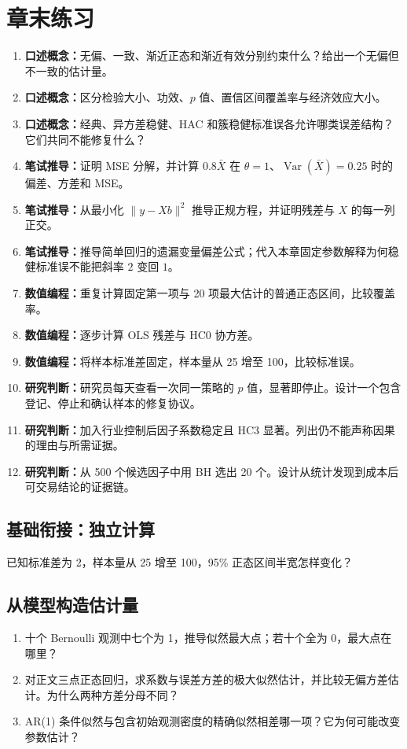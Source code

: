 \section*{章末练习}
\begingroup\small
\begin{enumerate}[leftmargin=*]
  \item \textbf{口述概念：}无偏、一致、渐近正态和渐近有效分别约束什么？给出一个无偏但不一致的估计量。
  \item \textbf{口述概念：}区分检验大小、功效、$p$ 值、置信区间覆盖率与经济效应大小。
  \item \textbf{口述概念：}经典、异方差稳健、HAC 和簇稳健标准误各允许哪类误差结构？它们共同不能修复什么？
  \item \textbf{笔试推导：}证明 MSE 分解，并计算 $0.8\bar X$ 在 $\theta=1$、$\operatorname{Var}(\bar X)=0.25$ 时的偏差、方差和 MSE。
  \item \textbf{笔试推导：}从最小化 $\lVert y-Xb\rVert^2$ 推导正规方程，并证明残差与 $X$ 的每一列正交。
  \item \textbf{笔试推导：}推导简单回归的遗漏变量偏差公式；代入本章固定参数解释为何稳健标准误不能把斜率 $2$ 变回 $1$。

  \item \textbf{数值编程：}重复计算固定第一项与 20 项最大估计的普通正态区间，比较覆盖率。

  \item \textbf{数值编程：}逐步计算 OLS 残差与 HC0 协方差。

  \item \textbf{数值编程：}将样本标准差固定，样本量从 25 增至 100，比较标准误。
  \item \textbf{研究判断：}研究员每天查看一次同一策略的 $p$ 值，显著即停止。设计一个包含登记、停止和确认样本的修复协议。
  \item \textbf{研究判断：}加入行业控制后因子系数稳定且 HC3 显著。列出仍不能声称因果的理由与所需证据。
  \item \textbf{研究判断：}从 500 个候选因子中用 BH 选出 20 个。设计从统计发现到成本后可交易结论的证据链。
\end{enumerate}
\endgroup

\subsection*{基础衔接：独立计算}
已知标准差为 2，样本量从 25 增至 100，95\% 正态区间半宽怎样变化？

\subsection*{从模型构造估计量}
\begin{enumerate}[leftmargin=*]
\item 十个 Bernoulli 观测中七个为 1，推导似然最大点；若十个全为 0，最大点在哪里？
\item 对正文三点正态回归，求系数与误差方差的极大似然估计，并比较无偏方差估计。为什么两种方差分母不同？
\item AR(1) 条件似然与包含初始观测密度的精确似然相差哪一项？它为何可能改变参数估计？
\end{enumerate}
